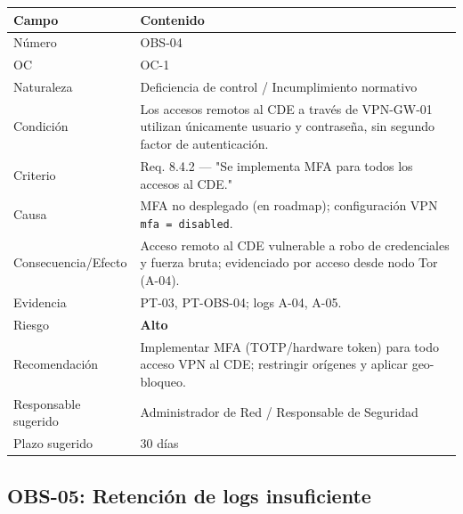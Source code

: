\documentclass[11pt,a4paper]{article}
\begin{document}
\begin{tabularx}{\textwidth}{P{5cm}L}
\toprule
\textbf{Campo} & \textbf{Contenido} \\
\midrule
Número & OBS-04 \\
OC & OC-1 \\
Naturaleza & Deficiencia de control / Incumplimiento normativo \\
Condición & Los accesos remotos al CDE a través de VPN-GW-01 utilizan únicamente usuario y contraseña, sin segundo factor de autenticación. \\
Criterio & Req. 8.4.2 — "Se implementa MFA para todos los accesos al CDE." \\
Causa & MFA no desplegado (en roadmap); configuración VPN \texttt{mfa = disabled}. \\
Consecuencia/Efecto & Acceso remoto al CDE vulnerable a robo de credenciales y fuerza bruta; evidenciado por acceso desde nodo Tor (A-04). \\
Evidencia & PT-03, PT-OBS-04; logs A-04, A-05. \\
Riesgo & \textbf{Alto} \\
Recomendación & Implementar MFA (TOTP/hardware token) para todo acceso VPN al CDE; restringir orígenes y aplicar geo-bloqueo. \\
Responsable sugerido & Administrador de Red / Responsable de Seguridad \\
Plazo sugerido & 30 días \\
\bottomrule
\end{tabularx}

\subsection{OBS-05: Retención de logs insuficiente}
\end{document}
